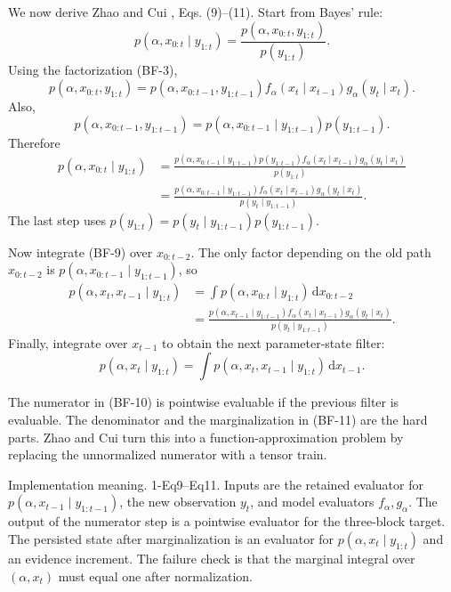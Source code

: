 \documentclass[11pt]{article}
\numberwithin{equation}{section}
\newcommand{\dd}{\,\mathrm d}
\begin{document}
We now derive Zhao and Cui \cite{zhao2024ttsequential}, Eqs. (9)--(11).  Start from Bayes' rule:
\[
 p(\alpha,x_{0:t}\mid y_{1:t})
 =
 \frac{p(\alpha,x_{0:t},y_{1:t})}{p(y_{1:t})}.
\]
Using the factorization (BF-3),
\[
 p(\alpha,x_{0:t},y_{1:t})
 =
 p(\alpha,x_{0:t-1},y_{1:t-1})
 f_\alpha(x_t\mid x_{t-1})g_\alpha(y_t\mid x_t).
\]
Also,
\[
 p(\alpha,x_{0:t-1},y_{1:t-1})
 =
 p(\alpha,x_{0:t-1}\mid y_{1:t-1})p(y_{1:t-1}).
\]
Therefore
\begin{equation}
\begin{aligned}
 p(\alpha,x_{0:t}\mid y_{1:t})
 &=
 \frac{
 p(\alpha,x_{0:t-1}\mid y_{1:t-1})p(y_{1:t-1})
 f_\alpha(x_t\mid x_{t-1})g_\alpha(y_t\mid x_t)}
 {p(y_{1:t})}\\
 &=
 \frac{
 p(\alpha,x_{0:t-1}\mid y_{1:t-1})
 f_\alpha(x_t\mid x_{t-1})g_\alpha(y_t\mid x_t)}
 {p(y_t\mid y_{1:t-1})}.
\end{aligned}
\label{eq:p24-bf-9}
\end{equation}
The last step uses \(p(y_{1:t})=p(y_t\mid y_{1:t-1})p(y_{1:t-1})\).

Now integrate (BF-9) over \(x_{0:t-2}\).  The only factor depending on the old
path \(x_{0:t-2}\) is
\(p(\alpha,x_{0:t-1}\mid y_{1:t-1})\), so
\begin{equation}
\begin{aligned}
 p(\alpha,x_t,x_{t-1}\mid y_{1:t})
 &=
 \int p(\alpha,x_{0:t}\mid y_{1:t})\dd x_{0:t-2}\\
 &=
 \frac{
 p(\alpha,x_{t-1}\mid y_{1:t-1})
 f_\alpha(x_t\mid x_{t-1})g_\alpha(y_t\mid x_t)}
 {p(y_t\mid y_{1:t-1})}.
\end{aligned}
\label{eq:p24-bf-10}
\end{equation}
Finally, integrate over \(x_{t-1}\) to obtain the next parameter-state filter:
\begin{equation}
    p(\alpha,x_t\mid y_{1:t})
    =
    \int p(\alpha,x_t,x_{t-1}\mid y_{1:t})\dd x_{t-1}.
    \label{eq:p24-bf-11}
\end{equation}

The numerator in (BF-10) is pointwise evaluable if the previous filter is
evaluable.  The denominator and the marginalization in (BF-11) are the hard
parts.  Zhao and Cui \cite{zhao2024ttsequential} turn this into a function-approximation problem by replacing
the unnormalized numerator with a tensor train.

Implementation meaning. 1-Eq9--Eq11.  Inputs are the retained evaluator
for \(p(\alpha,x_{t-1}\mid y_{1:t-1})\), the new observation \(y_t\), and model
evaluators \(f_\alpha,g_\alpha\).  The output of the numerator step is a
pointwise evaluator for the three-block target.  The persisted state after
marginalization is an evaluator for \(p(\alpha,x_t\mid y_{1:t})\) and an
evidence increment.  The failure check is that the marginal integral over
\((\alpha,x_t)\) must equal one after normalization.
\end{document}
